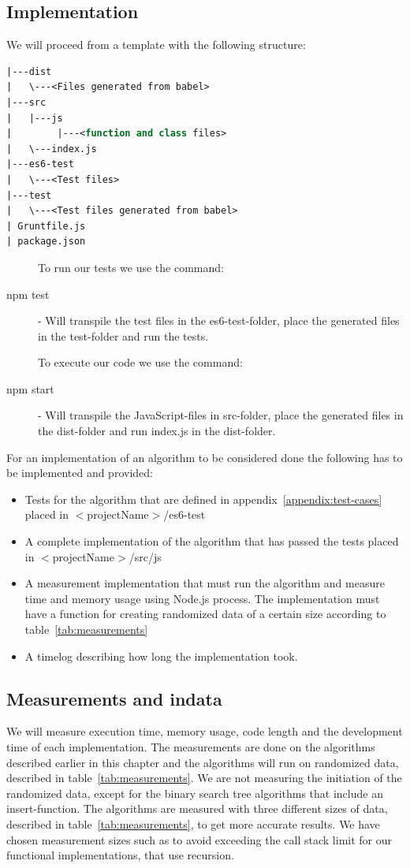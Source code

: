 \documentclass {article}
\begin{document}
\subsection{Implementation}
We will proceed from a template with the following structure:
 
\begin{lstlisting}[language=Pascal, deletekeywords={function, and}, numbers=none]
|---dist
|   \---<Files generated from babel>
|---src
|   |---js
|        |---<function and class files>
|   \---index.js
|---es6-test
|   \---<Test files>
|---test
|   \---<Test files generated from babel>
| Gruntfile.js
| package.json
\end{lstlisting}
 
\begin{description}
\item[] To run our tests we use the command:
\item[npm test] - Will transpile the test files in the es6-test-folder, place the generated files in the test-folder and run the tests.
\item[] To execute our code we use the command:
\item[npm start] - Will transpile the JavaScript-files in src-folder, place the generated files in the dist-folder and run index.js in the dist-folder.
\end{description}
 
For an implementation of an algorithm to be considered done the following has to be implemented and provided:
\begin{itemize}
\item Tests for the algorithm that are defined in appendix~\ref{appendix:test-cases} placed in \(<\)projectName\(>\)/es6-test
\item A complete implementation of the algorithm that has passed the tests placed in \(<\)projectName\(>\)/src/js
\item A measurement implementation that must run the algorithm and measure time and memory usage using Node.js process. The implementation must have a function for creating randomized data of a certain size according to table~\ref{tab:measurements} 
\item A timelog describing how long the implementation took. 
\end{itemize}
\subsection{Measurements and indata}
We will measure execution time, memory usage, code length and the development time of each implementation. The measurements are done on the algorithms described earlier in this chapter and the algorithms will run on randomized data, described in table~\ref{tab:measurements}. We are not measuring the initiation of the randomized data, except for the binary search tree algorithms that include an insert-function. The algorithms are measured with three different sizes of data, described in table~\ref{tab:measurements}, to get more accurate results. We have chosen measurement sizes such as to avoid exceeding the call stack limit for our functional implementations, that use recursion.
 
\end{document}
